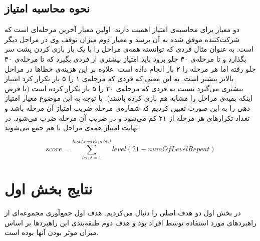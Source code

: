 \documentclass[twoside, a4paper,11pt]{book}
\numberwithin{equation}{chapter}
\numberwithin{table}{chapter}
\numberwithin{figure}{chapter}
\numberwithin{equation}{chapter}
\begin{document}
\subsection{نحوه محاسبه امتیاز}
دو معیار برای محاسبه‌ی امتیاز اهمیت دارند. اولین معیار آخرین مرحله‌ای است که شرکت‌کننده موفق شده به آن برسد و معیار دوم میزان توقف وی در مراحل دیگر است. به عنوان مثال فردی که توانسته همه‌ی مراحل را با یک بار بازی کردن پشت سر بگذارد و تا مرحله‌ی ۳۰ جلو برود باید امتیاز بیشتری از فردی بگیرد که تا مرحله‌ی ۳۰ جلو رفته اما هر مرحله را ۲ بار انجام داده است.
علاوه بر این هزینه‌ی خطاها در مراحل بالاتر بیشتر است. به این معنی که فردی که مرحله‌ی ۱ را ۵ بار تکرار کرد امتیاز بیشتری می‌گیرد نسبت به فردی که مرحله‌ی ۲۰ را ۵ بار تکرار کرده است (با فرض اینکه بقیه‌ی مراحل را مشابه هم بازی کرده باشند).
با توجه به این موضوع معیار امتیاز دهی را به این صورت تعیین کردیم که شماره‌ی مرحله ضریب امتیاز آن مرحله باشد و تعداد تکرارهای هر مرحله از ۲۱ کم می‌شود و در ضریب آن مرحله ضرب می‌شود. در نهایت امتیاز همه‌ی مراحل با هم جمع می‌شوند.

\begin{equation}
	score = \sum_{level=1}^{lastLevelReached} level(21-numOfLevelRepeat)
\end{equation}


\section{نتایج بخش اول}
در بخش اول دو هدف اصلی را دنبال می‌کردیم. هدف اول جمع‌آوری مجموعه‌ای از راهبرد‌های مورد استفاده توسط افراد بود و هدف دوم طبقه‌بندی این راهبرد‌ها بر اساس میزان موثر بودن آنها بوده است.
\end{document}
